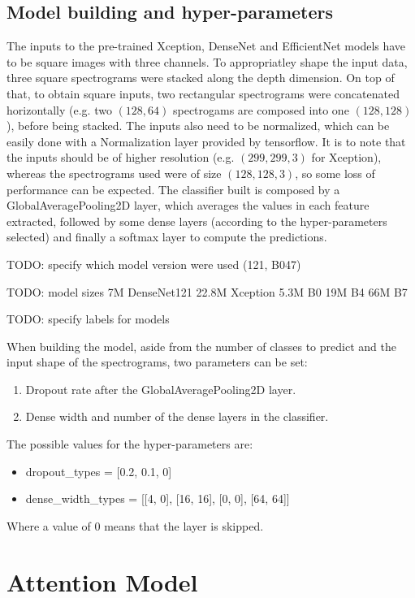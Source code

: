 \subsection{Model building and hyper-parameters}

The inputs to the pre-trained Xception, DenseNet and EfficientNet models have
to be square images with three channels.
To appropriatley shape the input data, three square spectrograms were stacked
along the depth dimension.
On top of that, to obtain square inputs, two rectangular spectrograms were
concatenated horizontally (e.g. two $\left( 128, 64 \right)$ spectrogams are
composed into one $\left( 128, 128 \right)$), before being stacked.
The inputs also need to be normalized, which can be easily done with a
Normalization layer provided by tensorflow.
It is to note that the inputs should be of higher resolution (e.g. $\left( 299,
299, 3 \right)$ for Xception), whereas the spectrograms used were of size
$\left( 128, 128, 3 \right)$, so some loss of performance can be expected.
The classifier built is composed by a GlobalAveragePooling2D layer, which
averages the values in each feature extracted, followed by some dense layers
(according to the hyper-parameters selected) and finally a softmax layer to
compute the predictions.

TODO: specify which model version were used (121, B047)

TODO: model sizes
7M DenseNet121
22.8M Xception
5.3M B0
19M B4
66M B7

TODO: specify labels for models

When building the model, aside from the number of classes to predict and the
input shape of the spectrograms, two parameters can be set:
\begin{enumerate}
    \item Dropout rate after the GlobalAveragePooling2D layer.
    \item Dense width and number of the dense layers in the classifier.
\end{enumerate}
The possible values for the hyper-parameters are:
\begin{itemize}
    \item dropout\_types = [0.2, 0.1, 0]
    \item dense\_width\_types = [[4, 0], [16, 16], [0, 0], [64, 64]]
\end{itemize}
Where a value of $0$ means that the layer is skipped.

\section{Attention Model}
\label{sec:attention_model}

